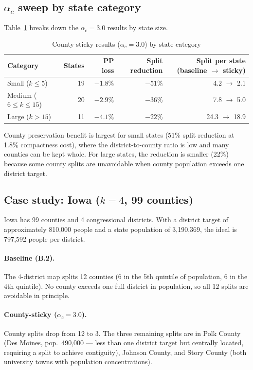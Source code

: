\subsection{$\alpha_c$ sweep by state category}

Table~\ref{tab:by-category} breaks down the $\alpha_c = 3.0$ results by
state size.

\begin{table}[htb]
\centering
\caption{County-sticky results ($\alpha_c = 3.0$) by state category}
\label{tab:by-category}
\begin{tabular}{lrrrr}
\toprule
Category & States & PP loss & Split reduction & Split per state (baseline $\to$ sticky) \\
\midrule
Small ($k \leq 5$)    & 19 & $-1.8\%$ & $-51\%$ & 4.2 $\to$ 2.1 \\
Medium ($6 \leq k \leq 15$) & 20 & $-2.9\%$ & $-36\%$ & 7.8 $\to$ 5.0 \\
Large ($k > 15$)      & 11 & $-4.1\%$ & $-22\%$ & 24.3 $\to$ 18.9 \\
\bottomrule
\end{tabular}
\end{table}

County preservation benefit is largest for small states (51\% split
reduction at 1.8\% compactness cost), where the district-to-county ratio
is low and many counties can be kept whole.  For large states, the
reduction is smaller (22\%) because some county splits are unavoidable
when county population exceeds one district target.

\subsection{Case study: Iowa ($k{=}4$, 99 counties)}

Iowa has 99 counties and 4 congressional districts.  With a district target
of approximately 810,000 people and a state population of 3,190,369, the
ideal is 797,592 people per district.

\paragraph{Baseline (B.2).}
The 4-district map splits 12 counties (6 in the 5th quintile of
population, 6 in the 4th quintile).  No county exceeds one full district
in population, so all 12 splits are avoidable in principle.

\paragraph{County-sticky ($\alpha_c = 3.0$).}
County splits drop from 12 to 3.  The three remaining splits are in
Polk County (Des Moines, pop.\ 490,000 --- less than one district target
but centrally located, requiring a split to achieve contiguity), Johnson
County, and Story County (both university towns with population
concentrations).

